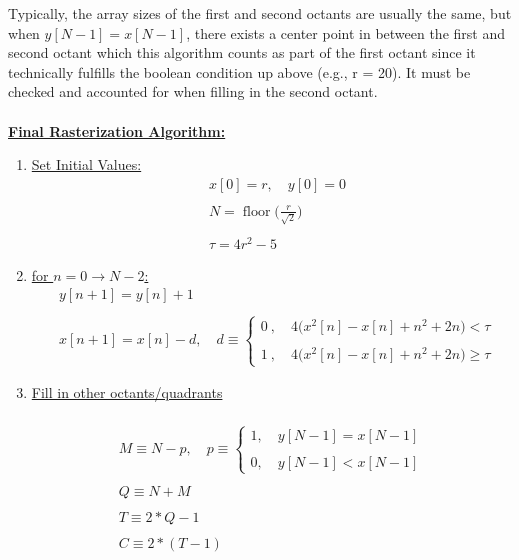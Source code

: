 \documentclass{article}
\DeclareMathOperator{\floor}{floor}
\begin{document}
Typically, the array sizes of the first and second octants are usually the same, but when $y[N - 1] = x[N - 1]$,
there exists a center point in between the first and second octant which this algorithm counts as part of the first
octant since it technically fulfills the boolean condition up above (e.g., r = 20). It must be checked and accounted for when filling
in the second octant. \\ \\

\underline{\textbf{Final Rasterization Algorithm:}} \\
\begin{enumerate}
    \item \underline{Set Initial Values:} 
          \begin{align*}
                &x[0] = r, \quad y[0] = 0 \\ \\
                &N = \floor\Bigg(\frac{r}{\sqrt{2}}\Bigg) \\ \\
                &\tau = 4r^{2} - 5
            \end{align*}
    \item \underline{for $n = 0 \rightarrow N - 2$:} \\
          \begin{align*}
            &y[n + 1] = y[n] + 1 \\ \\
            &x[n + 1] = x[n] - d, \quad d \equiv \begin{cases}
                                                     0 \ , \quad 4\Big(x^{2}[n] - x[n] + n^{2} + 2n\Big) < \tau \\ \\
                                                     1 \ , \quad 4\Big(x^{2}[n] - x[n] + n^{2} + 2n\Big) \geq \tau
                                                   \end{cases}
          \end{align*}
    \item \underline{Fill in other octants/quadrants} \\ \\

          \begin{align*}
                M \equiv N - p, \quad p \equiv \begin{cases}
                                                   1, \quad y[N - 1] = x[N - 1] \\ \\
                                                   0, \quad y[N - 1] < x[N - 1]
                                                 \end{cases} \\ \\
                Q \equiv N + M \\ \\
                T \equiv 2*Q - 1 \\ \\
                C \equiv 2*(T - 1) \\ \\
            \end{align*} 


\end{enumerate}
\end{document}
